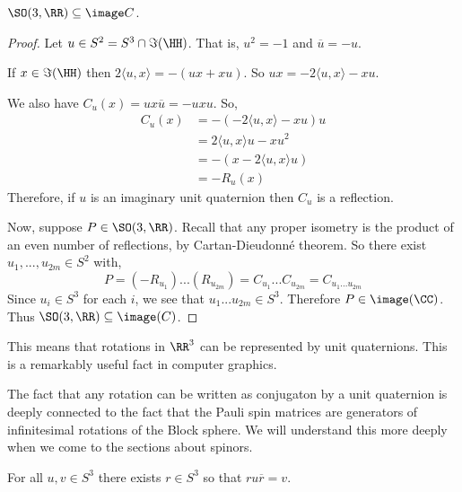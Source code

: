 \begin{lemma}
    $\SO(3,\RR) \subseteq \image C$.
\end{lemma}
\begin{proof}
    Let $u \in S^2=S^3\cap \Im(\HH)$. That is, $u^2 = -1$ and $\overline{u}=-u$.

    If $x \in \Im(\HH)$ then $2\langle u,x\rangle = -(ux+xu)$. So $ux = -2\langle u,x\rangle - xu$.

    We also have $C_u(x) = ux\overline{u} = -uxu$. So,
    \begin{align*}
        C_u(x) &= -(-2\langle u,x\rangle -xu)u\\
        &= 2\langle u,x\rangle u - xu^2\\
        &= -(x-2\langle u,x\rangle u)\\
        &= -R_u(x)
    \end{align*}
    Therefore, if $u$ is an imaginary unit quaternion then $C_u$ is a reflection.

    Now, suppose $P \in \SO(3,\RR)$. Recall that any proper isometry is the product of an even number of reflections, by Cartan-Dieudonn\'e theorem. So there exist $u_1,...,u_{2m}\in S^2$ with,
    \[P = (-R_{u_1})...(R_{u_{2m}}) = C_{u_1}...C_{u_{2m}} = C_{u_1...u_{2m}}\]
    Since $u_i \in S^3$ for each $i$, we see that $u_1...u_{2m}\in S^3$. Therefore $P \in \image(\CC)$. Thus $\SO(3,\RR) \subseteq \image(C)$.
\end{proof}
\begin{remark*}
    This means that rotations in $\RR^3$ can be represented by unit quaternions. This is a remarkably useful fact in computer graphics.
\end{remark*}
\begin{physics*}
    The fact that any rotation can be written as conjugaton by a unit quaternion is deeply connected to the fact that the Pauli spin matrices are generators of infinitesimal rotations of the Block sphere. We will understand this more deeply when we come to the sections about spinors.
\end{physics*}
\begin{cor}
    For all $u,v\in S^3$ there exists $r\in S^3$ so that $ru\overline{r} = v$. 
\end{cor}
